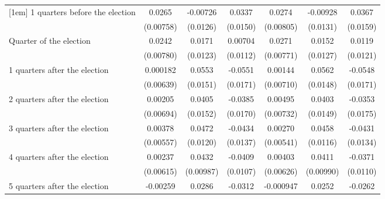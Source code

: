 \begin{table}[!ht]
\begin{tabular}{l*{6}{c}}
[1em]
 1 quarters before the election&      0.0265\sym{***}&    -0.00726         &      0.0337\sym{*}  &      0.0274\sym{***}&    -0.00928         &      0.0367\sym{*}  \\
                    &   (0.00758)         &    (0.0126)         &    (0.0150)         &   (0.00805)         &    (0.0131)         &    (0.0159)         \\
[1em]
Quarter of the election&      0.0242\sym{**} &      0.0171         &     0.00704         &      0.0271\sym{***}&      0.0152         &      0.0119         \\
                    &   (0.00780)         &    (0.0123)         &    (0.0112)         &   (0.00771)         &    (0.0127)         &    (0.0121)         \\
[1em]
 1 quarters after the election&    0.000182         &      0.0553\sym{***}&     -0.0551\sym{**} &     0.00144         &      0.0562\sym{***}&     -0.0548\sym{**} \\
                    &   (0.00639)         &    (0.0151)         &    (0.0171)         &   (0.00710)         &    (0.0148)         &    (0.0171)         \\
[1em]
 2 quarters after the election&     0.00205         &      0.0405\sym{**} &     -0.0385\sym{*}  &     0.00495         &      0.0403\sym{**} &     -0.0353\sym{*}  \\
                    &   (0.00694)         &    (0.0152)         &    (0.0170)         &   (0.00732)         &    (0.0149)         &    (0.0175)         \\
[1em]
 3 quarters after the election&     0.00378         &      0.0472\sym{***}&     -0.0434\sym{**} &     0.00270         &      0.0458\sym{***}&     -0.0431\sym{**} \\
                    &   (0.00557)         &    (0.0120)         &    (0.0137)         &   (0.00541)         &    (0.0116)         &    (0.0134)         \\
[1em]
 4 quarters after the election&     0.00237         &      0.0432\sym{***}&     -0.0409\sym{***}&     0.00403         &      0.0411\sym{***}&     -0.0371\sym{***}\\
                    &   (0.00615)         &   (0.00987)         &    (0.0107)         &   (0.00626)         &   (0.00990)         &    (0.0110)         \\
[1em]
 5 quarters after the election&    -0.00259         &      0.0286\sym{**} &     -0.0312\sym{**} &   -0.000947         &      0.0252\sym{*}  &     -0.0262\sym{*}  \\

\end{tabular}
\end{table}
